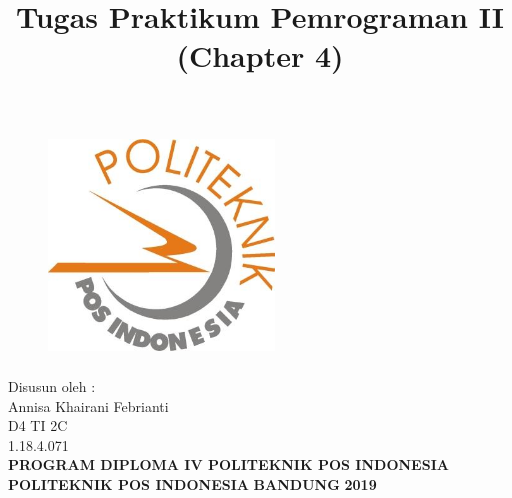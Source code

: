 \documentclass[a4paper, 12pt]{article}
\begin{document}
\title{\huge\textbf{Tugas Praktikum Pemrograman II (Chapter 4)}}
\date{}

\maketitle


\begin{figure}[!ht]
\begin{center}
\includegraphics[width = 6cm, height = 6cm]{poltekpos.jpg}
\end{center}
\end{figure}

\begin{center}
\vspace{1cm}
Disusun oleh :\\
Annisa Khairani Febrianti\\
D4 TI 2C\\
1.18.4.071\\
\vspace{1cm}
\textbf{PROGRAM DIPLOMA IV POLITEKNIK POS INDONESIA} \linebreak
\textbf{POLITEKNIK POS INDONESIA} \linebreak
\textbf{BANDUNG}\linebreak
\textbf{2019}

\end{center}


\thispagestyle{empty}


\end{document}

